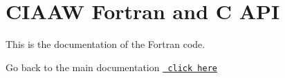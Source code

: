 \chapter{CIAAW Fortran and C API}
\hypertarget{index}{}\label{index}
\label{index_md_doxygen}%
%
 

This is the documentation of the Fortran code.

Go back to the main documentation \href{../../3-api/index.html}{\texttt{ click here}} 